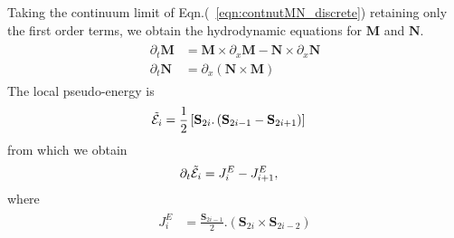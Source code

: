 \documentclass[prl,aps,twocolumn,nosuperscriptaddress,bibnotes,notitlepage,nofootinbib]{revtex4-2}
\newcommand{\magg}{\mathbf{M}}
\newcommand{\stagg}{\mathbf{N}}
\newcommand{\spin}{\mathbf{S}}
\begin{document}
Taking the continuum limit of Eqn.(~\ref{eqn:contnutMN_discrete}) retaining only the first order terms, we obtain the hydrodynamic equations for $\magg$ and $\stagg$.
\begin{align}
\label{eqn:contnuteqn_puredrvn}
\begin{split}
\partial_t \magg &=  \magg \times \partial_x \magg  - \stagg \times \partial_x \stagg \\
\partial_t \stagg &= \partial_x (\stagg \times \magg) 
\end{split}
\end{align}
The local pseudo-energy is
\begin{align*}
\begin{split}
\Tilde{\mathcal{E}}_i &= \frac{1}{2}\left[\spin_{2i}.\left(\spin_{2i-1}- \spin_{2i+1}\right) \right]
\end{split}
\end{align*} 
from which we obtain 
\begin{align*}
\begin{split}
\partial_t \Tilde{\mathcal{E}}_i &= J^E_i - J^E_{i+1},
\end{split}
\end{align*}
where 
\begin{align*}
\begin{split}
J^E_i &= \frac{\spin_{2i-1}}{2}.\left(\spin_{2i} \times \spin_{2i-2}\right)
\end{split}
\end{align*}
\end{document}
